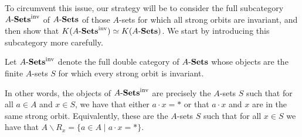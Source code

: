 \documentclass[11pt]{amsart}
\begin{document}
To circumvent this issue, our strategy will be to consider the full subcategory $A\text{-}\mathbf{Sets}^{\mathrm{inv}}$ of $A\text{-}\mathbf{Sets}$ of those $A$-sets for which all strong orbits are invariant, and then show that $K(A\text{-}\mathbf{Sets}^{\mathrm{inv}})\simeq K(A\text{-}\mathbf{Sets})$. We start by introducing this subcategory more carefully.

\begin{definition}
    Let $A\text{-}\mathbf{Sets}^{\mathrm{inv}}$ denote the full double category of $A\text{-}\mathbf{Sets}$ whose objects are the finite $A$-sets $S$ for which every strong orbit is invariant.  
\end{definition}

\begin{remark}
    In other words, the objects of $A\text{-}\mathbf{Sets}^{\mathrm{inv}}$ are precisely the $A$-sets $S$ such that for all  $a\in A$ and $x\in S$, we have that either $a\cdot x=*$ or that $a\cdot x$ and $x$ are in the same strong orbit. Equivalently, these are the $A$-sets $S$ such that for all $x\in S$ we have that $A\backslash R_x=\{a\in A \mid a\cdot x=*\}$. 
\end{remark}
\end{document}
